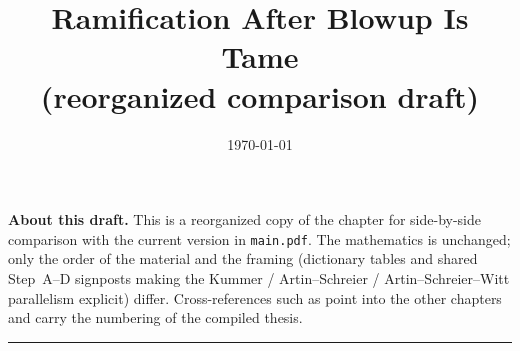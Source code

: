 \documentclass[11pt]{report}
\title{Ramification After Blowup Is Tame\\[2pt]\large (reorganized comparison draft)}
\author{}\date{\today}
\begin{document}
\maketitle
\noindent\textbf{About this draft.}
This is a reorganized copy of the chapter for side-by-side comparison with the
current version in \texttt{main.pdf}. The mathematics is unchanged; only the
order of the material and the framing (dictionary tables and shared
\mbox{Step A--D} signposts making the Kummer / Artin--Schreier /
Artin--Schreier--Witt parallelism explicit) differ. Cross-references such as
 point into the other chapters and carry the
numbering of the compiled thesis.
\bigskip\hrule\bigskip

\printbibliography
\end{document}
